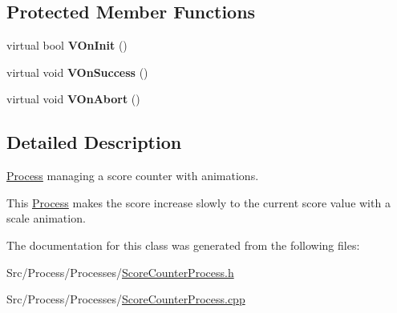\subsection*{Protected Member Functions}
\begin{DoxyCompactItemize}
\item 
\hypertarget{classScoreCounterProcess_aa12182f5d53b12d68a6f5f8ff299d4c8}{virtual bool {\bfseries V\-On\-Init} ()}\label{classScoreCounterProcess_aa12182f5d53b12d68a6f5f8ff299d4c8}

\item 
\hypertarget{classScoreCounterProcess_a648538c7aa5957ec6ee45f26ec4799ad}{virtual void {\bfseries V\-On\-Success} ()}\label{classScoreCounterProcess_a648538c7aa5957ec6ee45f26ec4799ad}

\item 
\hypertarget{classScoreCounterProcess_ae46ae5acfd35e682367762663d56eb0c}{virtual void {\bfseries V\-On\-Abort} ()}\label{classScoreCounterProcess_ae46ae5acfd35e682367762663d56eb0c}

\end{DoxyCompactItemize}


\subsection{Detailed Description}
\hyperlink{classProcess}{Process} managing a score counter with animations. 

This \hyperlink{classProcess}{Process} makes the score increase slowly to the current score value with a scale animation. 

The documentation for this class was generated from the following files\-:\begin{DoxyCompactItemize}
\item 
Src/\-Process/\-Processes/\hyperlink{ScoreCounterProcess_8h}{Score\-Counter\-Process.\-h}\item 
Src/\-Process/\-Processes/\hyperlink{ScoreCounterProcess_8cpp}{Score\-Counter\-Process.\-cpp}\end{DoxyCompactItemize}
